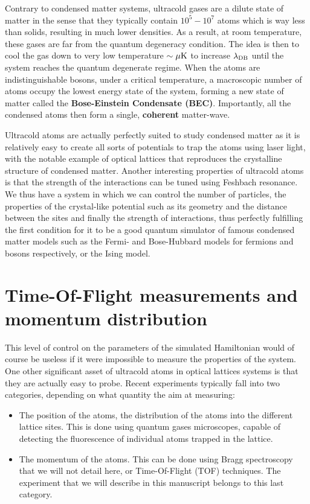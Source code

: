 Contrary to condensed matter systems, ultracold gases are a dilute state of matter in the sense that they typically contain $10^5-10^7$ atoms which is way less than solids, resulting in much lower densities. As a result, at room temperature, these gases are far from the quantum degeneracy condition. The idea is then to cool the gas down to very low temperature $\sim \mu \rm{K}$ to increase $\lambda_{\rm{DB}}$ until the system reaches the quantum degenerate regime. When the atoms are indistinguishable  bosons, under a critical temperature, a macroscopic number of atoms occupy the lowest energy state of the system, forming a new state of matter called the \textbf{Bose-Einstein Condensate (BEC)}. Importantly, all the condensed atoms then form a single, \textbf{coherent} matter-wave. 

Ultracold atoms are actually perfectly suited to study condensed matter as it is relatively easy to create all sorts of potentials to trap the atoms using laser light, with the notable example of optical lattices that reproduces the crystalline structure of condensed matter. Another interesting properties of ultracold atoms is that the strength of the interactions can be tuned using Feshbach resonance. We thus have a system in which we can control the number of particles, the properties of the crystal-like potential such as its geometry and the distance between the sites and finally the strength of interactions, thus perfectly fulfilling the first condition for it to be a good quantum simulator of famous condensed matter models such as the Fermi- and Bose-Hubbard models for fermions and bosons respectively, or the Ising model. 

\section*{Time-Of-Flight measurements and momentum distribution}

This level of control on the parameters of the simulated Hamiltonian would of course be useless if it were impossible to measure the properties of the system. One other significant asset of ultracold atoms in optical lattices systems is that they are actually easy to probe. Recent experiments typically fall into two categories, depending on what quantity the aim at measuring:

\begin{itemize}
 \item The position of the atoms, \ie the distribution of the atoms into the different lattice sites. This is done using quantum gases microscopes, capable of detecting the fluorescence of individual atoms trapped in the lattice.
 \item The momentum of the atoms. This can be done using Bragg spectroscopy that we will not detail here, or Time-Of-Flight (TOF) techniques. The experiment that we will describe in this manuscript belongs to this last category.
\end{itemize}

